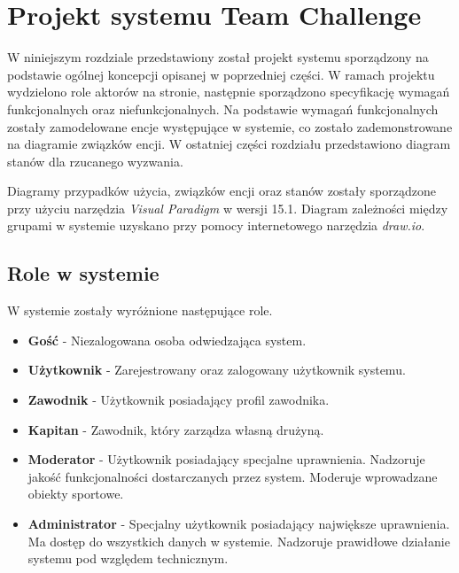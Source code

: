 \chapter{Projekt systemu Team Challenge}

W niniejszym rozdziale przedstawiony został projekt systemu sporządzony na podstawie ogólnej koncepcji opisanej w poprzedniej części. W ramach projektu wydzielono role aktorów na stronie, następnie sporządzono specyfikację wymagań funkcjonalnych oraz niefunkcjonalnych. Na podstawie wymagań funkcjonalnych zostały zamodelowane encje występujące w systemie, co zostało zademonstrowane na diagramie związków encji. W ostatniej części rozdziału przedstawiono diagram stanów dla rzucanego wyzwania.

Diagramy przypadków użycia, związków encji oraz stanów zostały sporządzone przy użyciu narzędzia \textit{Visual Paradigm} w wersji 15.1. Diagram zależności między grupami w systemie uzyskano przy pomocy internetowego narzędzia \textit{draw.io}.

\section{Role w systemie}

W systemie zostały wyróżnione następujące role. 

\begin{itemize}

\item \textbf{Gość} - Niezalogowana osoba odwiedzająca system.  

\item \textbf{Użytkownik} - Zarejestrowany oraz zalogowany użytkownik systemu.

\item \textbf{Zawodnik} - Użytkownik posiadający profil zawodnika.  

\item \textbf{Kapitan} - Zawodnik, który zarządza własną drużyną. 

\item \textbf{Moderator} - Użytkownik posiadający specjalne uprawnienia. Nadzoruje jakość funkcjonalności dostarczanych przez system. Moderuje wprowadzane obiekty sportowe.    

\item \textbf{Administrator} - Specjalny użytkownik posiadający największe uprawnienia. Ma dostęp do wszystkich danych w systemie. Nadzoruje prawidłowe działanie systemu pod względem technicznym.  

\end{itemize}



